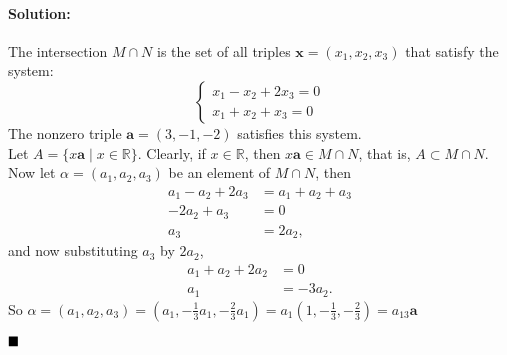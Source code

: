 \documentclass[]{article}
\newcommand{\RR}{\mathbb{R}}
\theoremstyle{definition}
\newenvironment{solution}{\paragraph{Solution:}}{\hfill$\blacksquare \\$}
\begin{document}
\begin{solution}
The intersection $M \cap N$ is the set of all triples $\mathbf{x} = (x_1, x_2, x_3)$ that satisfy the system:
\[
\begin{cases}
	x_1 - x_2 + 2x_3 = 0 \\
	x_1 + x_2 + x_3 = 0
\end{cases}
\]
The nonzero triple $\mathbf{a} = (3,-1,-2)$ satisfies this system. \\ 
Let $ A = \{x\mathbf{a} \mid x \in \RR\}$. Clearly, if $x \in \RR$, then $x\mathbf{a} \in M \cap N$, that is, $A \subset M \cap N$.
Now let $\alpha = (a_1, a_2, a_3)$ be an element of $M \cap N$, then
\begin{align*}
a_1 - a_2 + 2a_3 &= a_1 + a_2 + a_3	\\
-2a_2 + a_3 &= 0 \\
a_3 &= 2a_2, 
\end{align*}
and now substituting $a_3$ by $2a_2$,
\begin{align*}
a_1 + a_2 + 2a_2 &= 0 \\
a_1 &= -3a_2.	
\end{align*}
So $\alpha = (a_1, a_2, a_3) = (a_1, - \frac{1}{3}a_1, -\frac{2}{3}a_1) = a_1(1, - \frac{1}{3}, - \frac{2}{3}) = a_13\mathbf{a}$

\end{solution}
\end{document}
